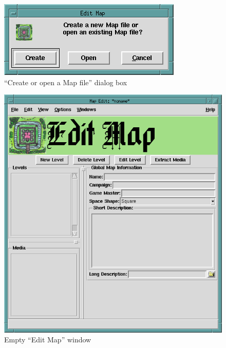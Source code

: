 \begin{figure}[hbpt] 
\begin{centering}
\includegraphics{CreateOrOpenMap.png} 
\caption{``Create or open a Map file'' dialog box} 
\label{fig:createoropenmap} 
\end{centering}
\end{figure} 
\begin{figure}[hbpt]
\begin{centering}
\includegraphics[width=5in]{EmptyMapEditorWindow.png}
\caption{Empty ``Edit Map'' window}
\label{fig:emptymapeditor}
\end{centering}
\end{figure}
